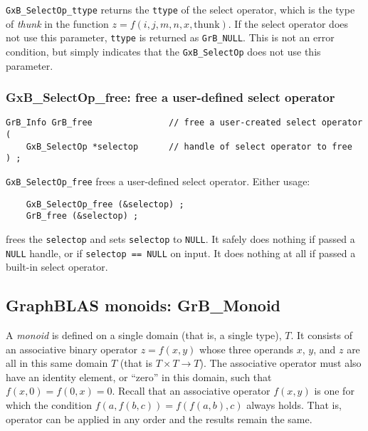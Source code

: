 \documentclass[12pt]{article}
\begin{document}
\verb'GxB_SelectOp_ttype' returns the \verb'ttype' of the select operator,
which is the type of {\em thunk} in the function $z=f(i,j,m,n,x,\mbox{thunk})$.
If the select operator does not use this parameter, \verb'ttype' is returned as
\verb'GrB_NULL'.  This is not an error condition, but simply indicates that the
\verb'GxB_SelectOp' does not use this parameter.

\subsubsection{{\sf GxB\_SelectOp\_free:} free a user-defined select operator}
\label{selectop_free}

\begin{mdframed}[userdefinedwidth=6in]
{\footnotesize
\begin{verbatim}
GrB_Info GrB_free               // free a user-created select operator
(
    GxB_SelectOp *selectop      // handle of select operator to free
) ;
\end{verbatim}
}\end{mdframed}

\verb'GxB_SelectOp_free' frees a user-defined select operator.  Either usage:

    {\small
    \begin{verbatim}
    GxB_SelectOp_free (&selectop) ;
    GrB_free (&selectop) ; \end{verbatim}}

\noindent
frees the \verb'selectop' and sets \verb'selectop' to \verb'NULL'.  It safely
does nothing if passed a \verb'NULL' handle, or if \verb'selectop == NULL' on
input.  It does nothing at all if passed a built-in select operator.

\newpage
\subsection{GraphBLAS monoids: {\sf GrB\_Monoid}} %
\label{monoid}

A {\em monoid} is defined on a single domain (that is, a single type), $T$.  It
consists of an associative binary operator $z=f(x,y)$ whose three operands $x$,
$y$, and $z$ are all in this same domain $T$ (that is $T \times T \rightarrow
T$).  The associative operator must also have an identity element, or ``zero''
in this domain, such that $f(x,0)=f(0,x)=0$.  Recall that an associative
operator $f(x,y)$ is one for which the condition $f(a, f(b,c)) = f(f (a,b),c)$
always holds.  That is, operator can be applied in any order and the results
remain the same.
\end{document}
